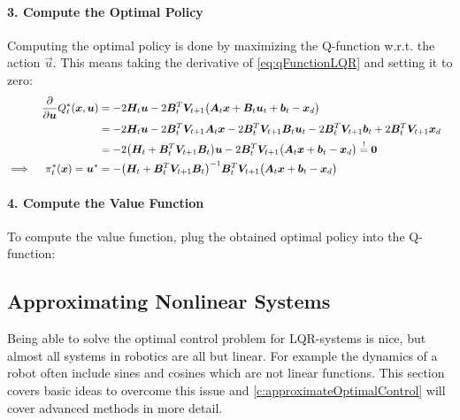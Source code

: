 				\paragraph{3. Compute the Optimal Policy}
					Computing the optimal policy is done by maximizing the Q-function w.r.t. the action \(\vec{u}\). This means taking the derivative of \eqref{eq:qFunctionLQR} and setting it to zero:
					\begin{align*}
						&& \pdv{\bm{u}} Q_t^\ast(\bm{x}, \bm{u})
							&= -2 \bm{H}_t \bm{u} - 2 \bm{B}_t^T \bm{V}_{t + 1} \big( \bm{A}_t \bm{x} + \bm{B}_t \bm{u}_t + \bm{b}_t - \bm{x}_d \big) & \\
						&&	&= -2 \bm{H}_t \bm{u} - 2 \bm{B}_t^T \bm{V}_{t + 1} \bm{A}_t \bm{x} - 2 \bm{B}_t^T \bm{V}_{t + 1} \bm{B}_t \bm{u}_t - 2 \bm{B}_t^T \bm{V}_{t + 1} \bm{b}_t + 2 \bm{B}_t^T \bm{V}_{t + 1} \bm{x}_d & \\
						&&	&= -2 \big( \bm{H}_t + \bm{B}_t^T \bm{V}_{t + 1} \bm{B}_t \big) \bm{u} - 2 \bm{B}_t^T \bm{V}_{t + 1} \big( \bm{A}_t \bm{x} + \bm{b}_t - \bm{x}_d \big) \overset{!}{=} \bm{0} & \\
						\implies && \pi_t^\ast(\bm{x}) = \bm{u}^\ast &= -\big( \bm{H}_t + \bm{B}_t^T \bm{V}_{t + 1} \bm{B}_t \big)^{-1} \bm{B}_t^T \bm{V}_{t + 1} \big( \bm{A}_t \bm{x} + \bm{b}_t - \bm{x}_d \big) &
					\end{align*}

				\paragraph{4. Compute the Value Function}
					To compute the value function, plug the obtained optimal policy into the Q-function:


		\subsection{Approximating Nonlinear Systems}
			Being able to solve the optimal control problem for LQR-systems is nice, but almost all systems in robotics are all but linear. For example the dynamics of a robot often include sines and cosines which are not linear functions. This section covers basic ideas to overcome this issue and \autoref{c:approximateOptimalControl} will cover advanced methods in more detail.

